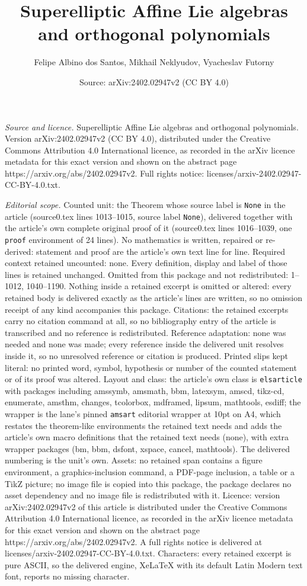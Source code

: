 \documentclass[10pt,a4paper]{amsart}
\title[Superelliptic Affine Lie algebras and orthogonal polynomials]{Superelliptic Affine Lie algebras and orthogonal polynomials}
\author{Felipe Albino dos Santos, Mikhail Neklyudov, Vyacheslav Futorny}
\date{Source: arXiv:2402.02947v2 (CC BY 4.0)}
\begin{document}
\maketitle

\noindent\emph{Source and licence.} Superelliptic Affine Lie algebras and orthogonal polynomials. Version arXiv:2402.02947v2 (CC BY 4.0), distributed under the Creative Commons Attribution 4.0 International licence, as recorded in the arXiv licence metadata for this exact version and shown on the abstract page https://arxiv.org/abs/2402.02947v2. Full rights notice: licenses/arxiv-2402.02947-CC-BY-4.0.txt.\par\smallskip

\noindent\textit{Editorial scope.} Counted unit: the Theorem whose source label is \texttt{None} in the article (source0.tex lines 1013--1015, source label \texttt{None}), delivered together with the article's own complete original proof of it (source0.tex lines 1016--1039, one \texttt{proof} environment of 24 lines). No mathematics is written, repaired or re-derived: statement and proof are the article's own text line for line. Required context retained uncounted: none. Every definition, display and label of those lines is retained unchanged. Omitted from this package and not redistributed: 1--1012, 1040--1190. Nothing inside a retained excerpt is omitted or altered: every retained body is delivered exactly as the article's lines are written, so no omission receipt of any kind accompanies this package. Citations: the retained excerpts carry no citation command at all, so no bibliography entry of the article is transcribed and no reference is redistributed. Reference adaptation: none was needed and none was made; every reference inside the delivered unit resolves inside it, so no unresolved reference or citation is produced. Printed slips kept literal: no printed word, symbol, hypothesis or number of the counted statement or of its proof was altered. Layout and class: the article's own class is \texttt{elsarticle} with packages including amssymb, amsmath, bbm, latexsym, amscd, tikz-cd, enumerate, amsthm, changes, tcolorbox, mdframed, lipsum, mathtools, esdiff; the wrapper is the lane's pinned \texttt{amsart} editorial wrapper at 10pt on A4, which restates the theorem-like environments the retained text needs and adds the article's own macro definitions that the retained text needs (none), with extra wrapper packages (bm, bbm, dsfont, xspace, cancel, mathtools). The delivered numbering is the unit's own. Assets: no retained span contains a figure environment, a graphics-inclusion command, a PDF-page inclusion, a table or a TikZ picture; no image file is copied into this package, the package declares no asset dependency and no image file is redistributed with it. Licence: version arXiv:2402.02947v2 of this article is distributed under the Creative Commons Attribution 4.0 International licence, as recorded in the arXiv licence metadata for this exact version and shown on the abstract page https://arxiv.org/abs/2402.02947v2. A full rights notice is delivered at licenses/arxiv-2402.02947-CC-BY-4.0.txt. Characters: every retained excerpt is pure ASCII, so the delivered engine, XeLaTeX with its default Latin Modern text font, reports no missing character.
\end{document}
